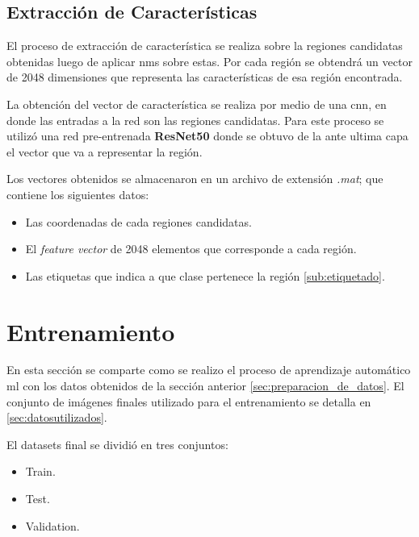 \subsection{Extracción de Características}\label{sub:extracciondecaracteristica}

El proceso de extracción de característica se realiza sobre la regiones candidatas obtenidas luego de aplicar \ac{nms} sobre estas. Por cada región se obtendrá un vector de 2048 dimensiones que representa las características de esa región encontrada.

La obtención del vector de característica se realiza por medio de una \ac{cnn}, en donde las entradas a la red son las regiones candidatas. Para este proceso se utilizó una red pre-entrenada \textbf{ResNet50} donde se obtuvo de la ante ultima capa el vector que va a representar la región.

Los vectores obtenidos se almacenaron en un archivo de extensión \textit{.mat}; que contiene los siguientes datos:
\begin{itemize}
 \item Las coordenadas de cada regiones candidatas.
 \item El \textit{feature vector} de 2048 elementos que corresponde a cada región. 
 \item Las etiquetas que indica a que clase pertenece la región \ref{sub:etiquetado}.
\end{itemize}





\section{Entrenamiento}\label{sec:entrenamiento}

En esta sección se comparte como se realizo el proceso de aprendizaje automático \ac{ml} con los datos obtenidos de la sección anterior \ref{sec:preparacion_de_datos}. El conjunto de imágenes finales utilizado para el entrenamiento se detalla en \ref{sec:datosutilizados}.

El datasets final se dividió en tres conjuntos:
\begin{itemize}
\item Train.
\item Test.
\item Validation.
\end{itemize}

